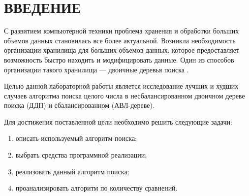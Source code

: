 \chapter*{ВВЕДЕНИЕ}

С развитием компьютерной техники проблема хранения и обработки больших объемов данных становилась все более актуальной.
Возникла необходимость организации хранилища для больших объемов данных, которое предоставляет возможность быстро находить и модифицировать данные. 
Один из способов организации такого хранилища --- двоичные деревья поиска \cite{info_book_bst}. 

Целью данной лабораторной работы является исследование лучших и худших случаев алгоритма поиска целого числа в несбалансированном двоичном дереве поиска (ДДП) и сбалансированном (АВЛ-дереве).

Для достижения поставленной цели необходимо решить следующие задачи:

\begin{enumerate}[label={\arabic*)}]
	\item описать используемый алгоритм поиска;
	\item выбрать средства программной реализации;
	\item реализовать данный алгоритм поиска;
	\item проанализировать алгоритм по количеству сравнений.
\end{enumerate}